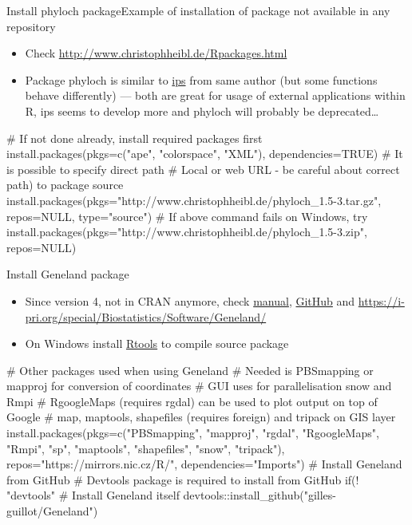 \documentclass[compress, ucs, xelatex, 11pt, xcolor=svgnames, aspectratio=169,
	hyperref={
		bookmarks=true,
		unicode=true,
		colorlinks=true,
		pdftitle={Molecular data in R},
		plainpages=false,
		pdfauthor={Vojtech Zeisek},
		pdfsubject={Course about phylogeny and evolution in R},
		pdfcreator={XeLaTeX},
		pdfkeywords={R, evolution, phylogeny, molecular data},
		linkcolor=Crimson, %
		anchorcolor=Magenta, %
		citecolor=Magenta, %
		filecolor=Magenta, %
		menucolor=Magenta, %
		urlcolor=DodgerBlue, %
		pdftex},
	url={hyphens, lowtilde} %
	]{beamer}
\begin{document}
\begin{frame}[fragile]{Install phyloch package}{Example of installation of package not available in any repository}
	\label{phyloch}
	\begin{itemize}
		\item Check \url{http://www.christophheibl.de/Rpackages.html}
		\item Package phyloch is similar to \href{https://CRAN.R-project.org/package=ips}{ips} from same author (but some functions behave differently) --- both are great for usage of external applications within R, ips seems to develop more and phyloch will probably be deprecated\ldots
	\end{itemize}
	\begin{spluscode}
    # If not done already, install required packages first
    install.packages(pkgs=c("ape", "colorspace", "XML"), dependencies=TRUE)
    # It is possible to specify direct path
    # Local or web URL - be careful about correct path) to package source
    install.packages(pkgs="http://www.christophheibl.de/phyloch_1.5-3.tar.gz",
      repos=NULL, type="source")
    # If above command fails on Windows, try
    install.packages(pkgs="http://www.christophheibl.de/phyloch_1.5-3.zip",
      repos=NULL)
	\end{spluscode}
\end{frame}

\begin{frame}[fragile]{Install Geneland package}
	\label{Geneland}
	\begin{itemize}
		\item Since version 4, not in CRAN anymore, check \href{https://i-pri.org/special/Biostatistics/Software/Geneland/Geneland-Doc.pdf}{manual}, \href{https://github.com/gilles-guillot/Geneland}{GitHub} and \url{https://i-pri.org/special/Biostatistics/Software/Geneland/}
		\item On Windows install \href{https://cran.r-project.org/bin/windows/Rtools/}{Rtools} to compile source package
	\end{itemize}
	\begin{spluscode}
    # Other packages used when using Geneland
    # Needed is PBSmapping or mapproj for conversion of coordinates
    # GUI uses for parallelisation snow and Rmpi
    # RgoogleMaps (requires rgdal) can be used to plot output on top of Google
    # map, maptools, shapefiles (requires foreign) and tripack on GIS layer
    install.packages(pkgs=c("PBSmapping", "mapproj", "rgdal", "RgoogleMaps",
      "Rmpi", "sp", "maptools", "shapefiles", "snow", "tripack"),
      repos="https://mirrors.nic.cz/R/", dependencies="Imports")
    # Install Geneland from GitHub
    # Devtools package is required to install from GitHub
    if(! "devtools" %
    # Install Geneland itself
    devtools::install_github("gilles-guillot/Geneland")
	\end{spluscode}
\end{frame}
\end{document}
